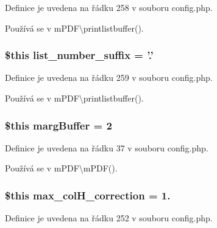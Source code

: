 Definice je uvedena na řádku 258 v souboru config.\-php.



Používá se v m\-P\-D\-F\textbackslash{}printlistbuffer().

\hypertarget{config_8php_af6ad73549a4b10d15c7b6cc3380e5681}{
\subsubsection[{list\-\_\-number\-\_\-suffix}]{\setlength{\rightskip}{0pt plus 5cm}\$this list\-\_\-number\-\_\-suffix = '.'}}\label{config_8php_af6ad73549a4b10d15c7b6cc3380e5681}


Definice je uvedena na řádku 259 v souboru config.\-php.



Používá se v m\-P\-D\-F\textbackslash{}printlistbuffer().

\hypertarget{config_8php_ac9dde0481ec6586daada0c4703f10540}{
\subsubsection[{marg\-Buffer}]{\setlength{\rightskip}{0pt plus 5cm}\$this marg\-Buffer = 2}}\label{config_8php_ac9dde0481ec6586daada0c4703f10540}


Definice je uvedena na řádku 37 v souboru config.\-php.



Používá se v m\-P\-D\-F\textbackslash{}m\-P\-D\-F().

\hypertarget{config_8php_aefb357428922f87374af6e3ece669508}{
\subsubsection[{max\-\_\-col\-H\-\_\-correction}]{\setlength{\rightskip}{0pt plus 5cm}\$this max\-\_\-col\-H\-\_\-correction = 1.}}\label{config_8php_aefb357428922f87374af6e3ece669508}


Definice je uvedena na řádku 252 v souboru config.\-php.



